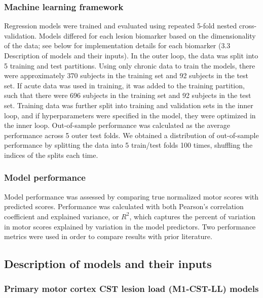 \documentclass[10pt]{article}
\begin{document}
\subsubsection*{Machine learning framework}
Regression models were trained and evaluated using repeated 5-fold nested cross-validation. Models differed for each lesion biomarker based on the dimensionality of the data; see below for implementation details for each biomarker (3.3 Description of models and their inputs). In the outer loop, the data was split into 5 training and test partitions. Using only chronic data to train the models, there were approximately 370 subjects in the training set and 92 subjects in the test set. If acute data was used in training, it was added to the training partition, such that there were 696 subjects in the training set and 92 subjects in the test set. Training data was further split into training and validation sets in the inner loop, and if hyperparameters were specified in the model, they were optimized in the inner loop. Out-of-sample performance was calculated as the average performance across 5 outer test folds. We obtained a distribution of out-of-sample performance by splitting the data into 5 train/test folds 100 times, shuffling the indices of the splits each time. 

\subsubsection*{Model performance}
Model performance was assessed by comparing true normalized motor scores with predicted scores. Performance was calculated with both Pearson's correlation coefficient and explained variance, or $R^2$, which captures the percent of variation in motor scores explained by variation in the model predictors. Two performance metrics were used in order to compare results with prior literature.

\subsection{Description of models and their inputs}
\subsubsection*{Primary motor cortex CST lesion load (M1-CST-LL) models}
\end{document}
